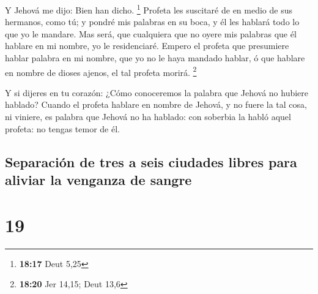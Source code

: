 Y Jehová me dijo: Bien han dicho. \footnote{\textbf{18:17}
  Deut 5,25}  Profeta les suscitaré de en medio de sus
hermanos, como tú; y pondré mis palabras en su boca, y él les hablará
todo lo que yo le mandare.  Mas será, que cualquiera que
no oyere mis palabras que él hablare en mi nombre, yo le residenciaré.
 Empero el profeta que presumiere hablar palabra en mi
nombre, que yo no le haya mandado hablar, ó que hablare en nombre de
dioses ajenos, el tal profeta morirá. \footnote{\textbf{18:20} Jer
  14,15; Deut 13,6}

 Y si dijeres en tu corazón: ¿Cómo conoceremos la palabra
que Jehová no hubiere hablado?  Cuando el profeta hablare
en nombre de Jehová, y no fuere la tal cosa, ni viniere, es palabra que
Jehová no ha hablado: con soberbia la habló aquel profeta: no tengas
temor de él.

\hypertarget{separaciuxf3n-de-tres-a-seis-ciudades-libres-para-aliviar-la-venganza-de-sangre}{%
\subsection{Separación de tres a seis ciudades libres para aliviar la
venganza de
sangre}\label{separaciuxf3n-de-tres-a-seis-ciudades-libres-para-aliviar-la-venganza-de-sangre}}

\hypertarget{section-18}{%
\section{19}\label{section-18}}

